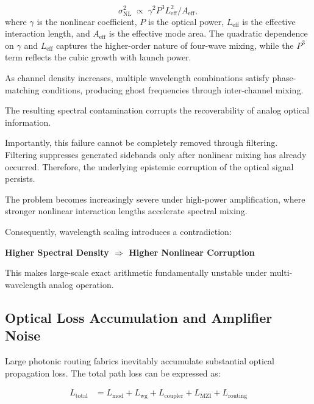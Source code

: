\documentclass[journal]{IEEEtran}
\begin{document}
\begin{equation}
\sigma_{\mathrm{NL}}^2 \;\propto\; \gamma^2 P^3 L_{\mathrm{eff}}^2 / A_{\mathrm{eff}},
\label{eq:fwm_scaling}
\end{equation}
where $\gamma$ is the nonlinear coefficient, $P$ is the optical power, $L_{\mathrm{eff}}$ is the effective interaction length, and $A_{\mathrm{eff}}$ is the effective mode area. The quadratic dependence on $\gamma$ and $L_{\mathrm{eff}}$ captures the higher-order nature of four-wave mixing, while the $P^3$ term reflects the cubic growth with launch power.

As channel density increases, multiple wavelength combinations satisfy phase-matching conditions, producing ghost frequencies through inter-channel mixing.

The resulting spectral contamination corrupts the recoverability of analog optical information.

Importantly, this failure cannot be completely removed through filtering. Filtering suppresses generated sidebands only after nonlinear mixing has already occurred. Therefore, the underlying epistemic corruption of the optical signal persists.

The problem becomes increasingly severe under high-power amplification, where stronger nonlinear interaction lengths accelerate spectral mixing.

Consequently, wavelength scaling introduces a contradiction:

\begin{center}
\textbf{Higher Spectral Density $\Longrightarrow$ Higher Nonlinear Corruption}
\label{eq:wdm_contradiction}
\end{center}

This makes large-scale exact arithmetic fundamentally unstable under multi-wavelength analog operation.

\subsection{\textbf{Optical Loss Accumulation and Amplifier Noise}}

Large photonic routing fabrics inevitably accumulate substantial optical propagation loss. The total path loss can be expressed as:

\begin{align}
L_{\mathrm{total}}
&=
L_{\mathrm{mod}}
+
L_{\mathrm{wg}}
+
L_{\mathrm{coupler}}
+
L_{\mathrm{MZI}}
+
L_{\mathrm{routing}}
\label{eq:total_loss}
\end{align}
\end{document}
